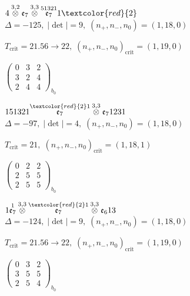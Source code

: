 \documentclass[10pt]{article}
\begin{document}
$4\overset{3,2}{\otimes}\mathfrak{e}_7\overset{3,3}{\otimes}\overset{51321}{\mathfrak{e}_7}1\textcolor{red}{2}$ \quad $\Delta=-125,\; |\det|=9,\; (n_+,n_-,n_0)=(1,18,0)$

\hspace{1em}$T_{\text{crit}}=21.56 \to 22,\; (n_+,n_-,n_0)_{\text{crit}}=(1,19,0)$

\hspace{2em}$\left(\begin{smallmatrix}0 & 3 & 2 \\ 3 & 2 & 4 \\ 2 & 4 & 4\end{smallmatrix}\right)_{\!b_0}$

\smallskip

$151321\overset{\textcolor{red}{2}1}{\mathfrak{e}_7}\overset{3,3}{\otimes}\mathfrak{e}_71231$ \quad $\Delta=-97,\; |\det|=4,\; (n_+,n_-,n_0)=(1,18,0)$

\hspace{1em}$T_{\text{crit}}=21,\; (n_+,n_-,n_0)_{\text{crit}}=(1,18,1)$

\hspace{2em}$\left(\begin{smallmatrix}0 & 2 & 2 \\ 2 & 5 & 5 \\ 2 & 5 & 5\end{smallmatrix}\right)_{\!b_0}$

\smallskip

$1\overset{1}{\mathfrak{e}_7}\overset{3,3}{\otimes}\overset{\textcolor{red}{2}1}{\mathfrak{e}_7}\overset{3,3}{\otimes}\mathfrak{e}_613$ \quad $\Delta=-124,\; |\det|=9,\; (n_+,n_-,n_0)=(1,18,0)$

\hspace{1em}$T_{\text{crit}}=21.56 \to 22,\; (n_+,n_-,n_0)_{\text{crit}}=(1,19,0)$

\hspace{2em}$\left(\begin{smallmatrix}0 & 3 & 2 \\ 3 & 5 & 5 \\ 2 & 5 & 4\end{smallmatrix}\right)_{\!b_0}$

\smallskip
\end{document}
